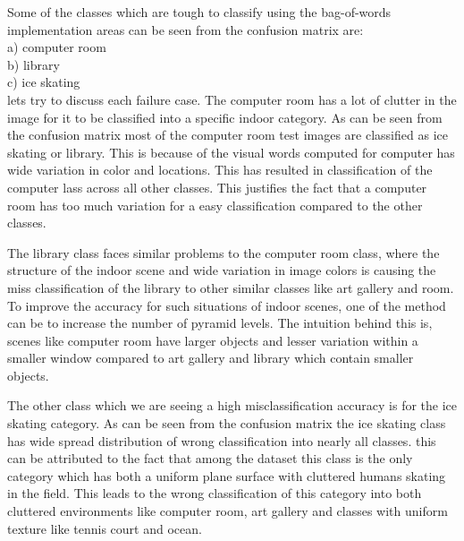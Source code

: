 \documentclass[12pt]{article}
\newenvironment{problem}[2][Problem]{\begin{trivlist}
\item[\hskip \labelsep {\bfseries #1}\hskip \labelsep {\bfseries #2.}]}{\end{trivlist}}
\begin{document}
\begin{problem}{2.6}
Some of the classes which are tough to classify using the bag-of-words implementation areas can be seen from the confusion matrix are:\\
a) computer room\\
b) library \\
c) ice skating\\

lets try to discuss each failure case. The computer room has a lot of clutter in the image for it to be classified into a specific indoor category. As can be seen from the confusion matrix most of the computer room test images are classified as ice skating or library. This is because of the visual words computed for computer has wide variation in color and locations. This has resulted in classification of the computer lass across all other classes. This justifies the fact that a computer room has too much variation for a easy classification compared to the other classes.  

The library class faces similar problems to the computer room class, where the structure of the indoor scene and wide variation in image colors is causing the miss classification of the library to other similar classes like art gallery and room. To improve the accuracy for such situations of indoor scenes, one of the method can be to increase the number of pyramid levels. The intuition behind this is, scenes like computer room have larger objects and lesser variation within a smaller window compared to art gallery and library which contain smaller objects.

The other class which we are seeing a high misclassification accuracy is for the ice skating category. As can be seen from the confusion matrix the ice skating class has wide spread distribution of wrong classification into nearly all classes. this can be attributed to the fact that among the dataset this class is the only category which has both a uniform plane surface with cluttered humans skating in the field. This leads to the wrong classification of this category into both cluttered environments like computer room, art gallery and classes with uniform texture like tennis court and ocean. 
\end{problem}
\newpage
\end{document}
